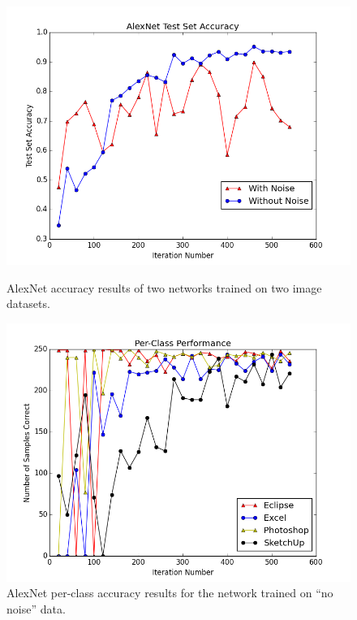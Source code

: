 \documentclass[10pt]{article}
\begin{document}
\begin{figure}
\centering
  \begin{minipage}{.45\textwidth}
  \centering
  \includegraphics[width=1\linewidth]{AlexNet_Accuracy}
  \caption{AlexNet accuracy results of two networks trained on two image datasets.}
  \label{fig:alex_net}
  \end{minipage}\hfill
  \begin{minipage}{.45\textwidth}
  \centering
  \includegraphics[width=1\linewidth]{PerClassPerformance}
  \caption{AlexNet per-class accuracy results for the network trained on ``no noise'' data.}
  \label{fig:per_class}
  \end{minipage}
\end{figure}
\end{document}
